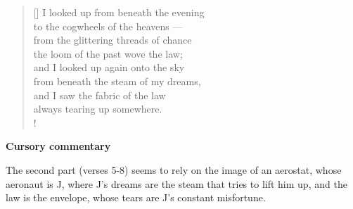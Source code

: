 \documentclass[a4paper,12pt,twoside,final]{book}
\begin{document}
\newpage


\settowidth{\versewidth}{from under the steam of my dreams,}

\begin{verse}[\versewidth]
  I looked up from beneath the evening \\
  to the cogwheels of the heavens --- \\
  from the glittering threads of chance \\
  the loom of the past wove the law; \\
  and I looked up again onto the sky \\
  from beneath the steam of my dreams, \\
  and I saw the fabric of the law \\
  always tearing up somewhere. \\!
\end{verse}


\bigskip

\noindent \textbf{Cursory commentary}

\medskip

The second part (verses 5-8) seems to rely on the image of an
aerostat, whose aeronaut is J, where J's dreams are the steam that
tries to lift him up, and the law is the envelope, whose tears are J's
constant misfortune.

\newpage

\settowidth{\versewidth}{törvényt szőtt a mult szövőszéke}
\end{document}
